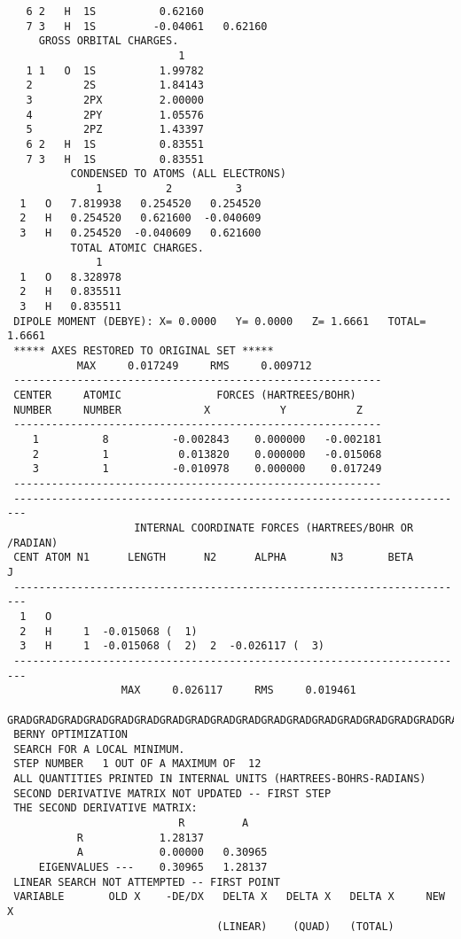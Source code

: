 {\begin{verbatim}
   6 2   H  1S          0.62160
   7 3   H  1S         -0.04061   0.62160
     GROSS ORBITAL CHARGES.
                           1
   1 1   O  1S          1.99782
   2        2S          1.84143
   3        2PX         2.00000
   4        2PY         1.05576
   5        2PZ         1.43397
   6 2   H  1S          0.83551
   7 3   H  1S          0.83551
          CONDENSED TO ATOMS (ALL ELECTRONS)
              1          2          3
  1   O   7.819938   0.254520   0.254520
  2   H   0.254520   0.621600  -0.040609
  3   H   0.254520  -0.040609   0.621600
          TOTAL ATOMIC CHARGES.
              1
  1   O   8.328978
  2   H   0.835511
  3   H   0.835511
 DIPOLE MOMENT (DEBYE): X= 0.0000   Y= 0.0000   Z= 1.6661   TOTAL= 1.6661
 ***** AXES RESTORED TO ORIGINAL SET *****
           MAX     0.017249     RMS     0.009712
 ----------------------------------------------------------
 CENTER     ATOMIC               FORCES (HARTREES/BOHR)
 NUMBER     NUMBER             X           Y           Z
 ----------------------------------------------------------
    1          8          -0.002843    0.000000   -0.002181
    2          1           0.013820    0.000000   -0.015068
    3          1          -0.010978    0.000000    0.017249
 ----------------------------------------------------------
 ------------------------------------------------------------------------
                    INTERNAL COORDINATE FORCES (HARTREES/BOHR OR /RADIAN)
 CENT ATOM N1      LENGTH      N2      ALPHA       N3       BETA        J
 ------------------------------------------------------------------------
  1   O 
  2   H     1  -0.015068 (  1)
  3   H     1  -0.015068 (  2)  2  -0.026117 (  3)
 ------------------------------------------------------------------------
                  MAX     0.026117     RMS     0.019461
 GRADGRADGRADGRADGRADGRADGRADGRADGRADGRADGRADGRADGRADGRADGRADGRADGRADGRAD
 BERNY OPTIMIZATION
 SEARCH FOR A LOCAL MINIMUM.
 STEP NUMBER   1 OUT OF A MAXIMUM OF  12
 ALL QUANTITIES PRINTED IN INTERNAL UNITS (HARTREES-BOHRS-RADIANS)
 SECOND DERIVATIVE MATRIX NOT UPDATED -- FIRST STEP
 THE SECOND DERIVATIVE MATRIX:
                           R         A
           R            1.28137
           A            0.00000   0.30965
     EIGENVALUES ---    0.30965   1.28137
 LINEAR SEARCH NOT ATTEMPTED -- FIRST POINT
 VARIABLE       OLD X    -DE/DX   DELTA X   DELTA X   DELTA X     NEW X
                                 (LINEAR)    (QUAD)   (TOTAL)


\end{verbatim}}
